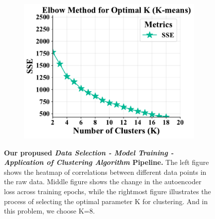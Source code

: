\documentclass{article} %
\begin{document}
\begin{figure}[!t]
\begin{subfigure}{.32\textwidth}
       \vspace{-5pt}
       \label{fig:loss}
   \end{subfigure}
   \hfill %
   \begin{subfigure}{.32\textwidth}
       \centering
       \includegraphics[width=1.0\linewidth]{./figures/elbow_method_deep_kmeans.pdf}
       \vspace{-5pt}
       \label{fig:elbow}
   \end{subfigure}
   \caption{\textbf{Our propused \textit{Data Selection - Model Training - Application of Clustering Algorithm} Pipeline.} The left figure shows the heatmap of correlations between different data points in the raw data. Middle figure shows the change in the autoencoder loss across training epochs, while the rightmost figure illustrates the process of selecting the optimal parameter K for clustering. And in this problem, we choose K=8.}
   \vspace{-10pt}
   \label{fig:pipeline}
\end{figure}
\end{document}
